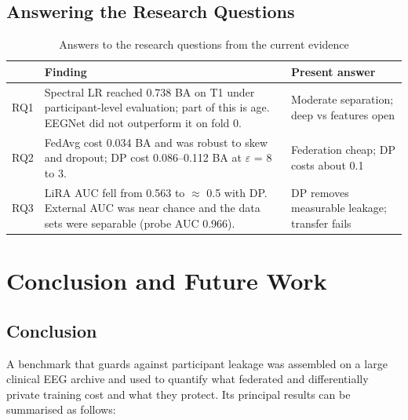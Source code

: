 \documentclass[12pt,a4paper,oneside]{report}
\begin{document}
\section{Answering the Research Questions}
\begin{table}[!htbp]\centering\small{}
\caption{Answers to the research questions from the current evidence}\label{tab:rq}
\begin{tabularx}{\textwidth}{lXl}
\toprule
 & Finding & Present answer\\
\midrule
RQ1 & Spectral LR reached 0.738 BA on T1 under participant-level evaluation; part of this is age. EEGNet did not outperform it on fold 0. & Moderate separation; deep vs features open\\
RQ2 & FedAvg cost 0.034 BA and was robust to skew and dropout; DP cost 0.086--0.112 BA at $\varepsilon$ = 8 to 3. & Federation cheap; DP costs about 0.1\\
RQ3 & LiRA AUC fell from 0.563 to $\approx$ 0.5 with DP. External AUC was near chance and the data sets were separable (probe AUC 0.966). & DP removes measurable leakage; transfer fails\\
\bottomrule
\end{tabularx}
\end{table}

\chapter{Conclusion and Future Work}

\section{Conclusion}
A benchmark that guards against participant leakage was assembled on a large clinical EEG archive and used to quantify what federated and differentially private training cost and what they protect. Its principal results can be summarised as follows:
\end{document}
